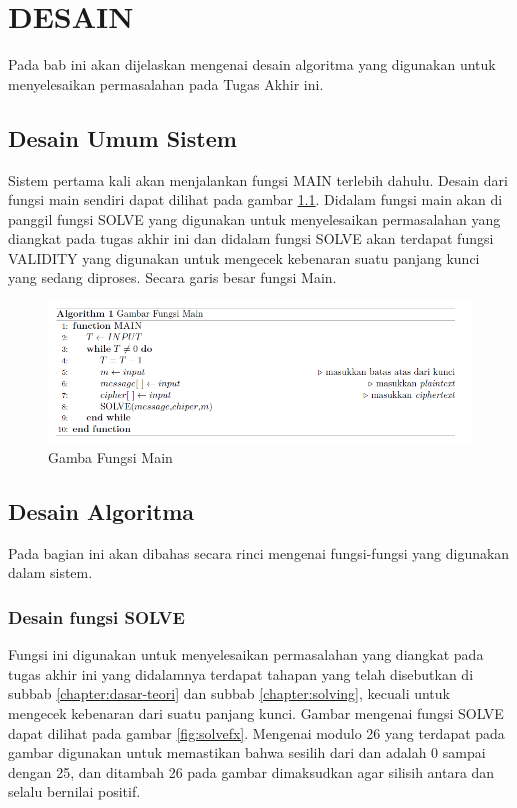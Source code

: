 \chapter{DESAIN}
\label{chapter:design}
Pada bab ini akan dijelaskan mengenai desain algoritma yang digunakan untuk menyelesaikan permasalahan pada Tugas Akhir ini.
\section{Desain Umum Sistem}	
Sistem pertama kali akan menjalankan fungsi MAIN terlebih dahulu. Desain dari fungsi main sendiri dapat dilihat pada gambar \ref{fig:mainfx}. Didalam fungsi main akan di panggil fungsi SOLVE yang digunakan untuk menyelesaikan permasalahan yang diangkat pada tugas akhir ini dan didalam fungsi SOLVE akan terdapat fungsi VALIDITY yang digunakan untuk mengecek kebenaran suatu panjang kunci yang sedang diproses. Secara garis besar fungsi Main.


\begin{figure}[H]
		\centering
		\includegraphics[scale=0.5]{images/bab3/mainfx.png}
		\caption{Gamba Fungsi Main}
		\label{fig:mainfx}
	\end{figure}

\section{Desain Algoritma}
 Pada bagian ini akan dibahas secara rinci mengenai fungsi-fungsi yang digunakan dalam sistem.  
  \subsection{Desain fungsi SOLVE}
  \label{chapter:fxsolve}
  Fungsi ini digunakan untuk menyelesaikan permasalahan yang diangkat pada tugas akhir ini yang didalamnya terdapat tahapan yang telah disebutkan di subbab \ref{chapter:dasar-teori} dan subbab \ref{chapter:solving}, kecuali untuk mengecek kebenaran dari suatu panjang kunci. Gambar mengenai fungsi SOLVE dapat dilihat pada gambar \ref{fig:solvefx}. Mengenai modulo 26 yang terdapat pada gambar digunakan untuk memastikan bahwa sesilih dari \plaintext dan \ciphertext adalah 0 sampai dengan 25, dan ditambah 26 pada gambar dimaksudkan agar silisih antara \plaintext dan \ciphertext selalu bernilai positif.
  
